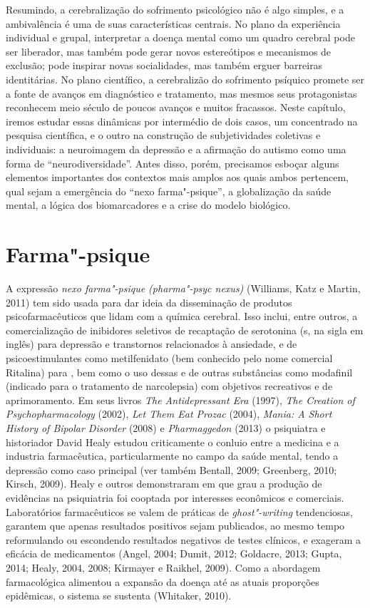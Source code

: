 Resumindo, a cerebralização do sofrimento psicológico não é algo
simples, e a ambivalência é uma de suas características centrais. No
plano da experiência individual e grupal, interpretar a doença mental
como um quadro cerebral pode ser liberador, mas também pode gerar novos
estereótipos e mecanismos de exclusão; pode inspirar novas socialidades,
mas também erguer barreiras identitárias. No plano científico, a
cerebralizão do sofrimento psíquico promete ser a fonte de avanços em
diagnóstico e tratamento, mas mesmos seus protagonistas reconhecem meio
século de poucos avanços e muitos fracassos. Neste capítulo, iremos
estudar essas dinâmicas por intermédio de dois casos, um concentrado na
pesquisa científica, e o outro na construção de subjetividades coletivas
e individuais: a neuroimagem da depressão e a afirmação do autismo como
uma forma de ``neurodiversidade''. Antes disso, porém, precisamos
esboçar alguns elementos importantes dos contextos mais amplos aos quais
ambos pertencem, qual sejam a emergência do ``nexo farma"-psique'', a
globalização da saúde mental, a lógica dos biomarcadores e a crise do
modelo biológico.

\section{Farma"-psique}

A expressão \emph{nexo farma"-psique (pharma"-psyc nexus)} (Williams, Katz
e Martin, 2011) tem sido usada para dar ideia da disseminação de
produtos psicofarmacêuticos que lidam com a química cerebral. Isso
inclui, entre outros, a comercialização de inibidores seletivos de
recaptação de serotonina (s, na sigla em inglês) para depressão e
transtornos relacionados à ansiedade, e de psicoestimulantes como
metilfenidato (bem conhecido pelo nome comercial Ritalina) para ,
bem como o uso dessas e de outras substâncias como modafinil (indicado
para o tratamento de narcolepsia) com objetivos recreativos e de
aprimoramento. Em seus livros \emph{The Antidepressant Era} (1997),
\emph{The Creation of Psychopharmacology} (2002), \emph{Let Them Eat
Prozac} (2004), \emph{Mania: A Short History of Bipolar Disorder} (2008)
e \emph{Pharmaggedon} (2013) o psiquiatra e historiador David Healy
estudou criticamente o conluio entre a medicina e a industria
farmacêutica, particularmente no campo da saúde mental, tendo a
depressão como caso principal (ver também Bentall, 2009; Greenberg,
2010; Kirsch, 2009). Healy e outros demonstraram em que grau a produção
de evidências na psiquiatria foi cooptada por interesses econômicos e
comerciais. Laboratórios farmacêuticos se valem de práticas de
\emph{ghost"-writing} tendenciosas, garantem que apenas resultados
positivos sejam publicados, ao mesmo tempo reformulando ou escondendo
resultados negativos de testes clínicos, e exageram a eficácia de
medicamentos (Angel, 2004; Dumit, 2012; Goldacre, 2013; Gupta, 2014;
Healy, 2004, 2008; Kirmayer e Raikhel, 2009). Como a abordagem
farmacológica alimentou a expansão da doença até as atuais proporções
epidêmicas, o sistema se sustenta (Whitaker, 2010).

